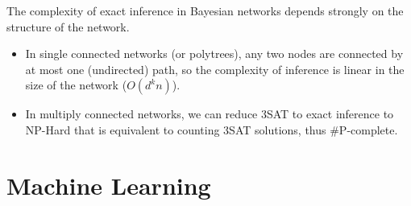\documentclass[12pt]{article}
\begin{document}
\begin{enumerate}[label=\textbf{U.\arabic*}]
    The complexity of exact inference in Bayesian networks depends strongly on the structure of the network.
    \begin{itemize}
        \item In single connected networks (or polytrees), any two nodes are connected by at most one (undirected) path, 
        so the complexity of inference is linear in the size of the network ($O(d^kn)$).
        \item In multiply connected networks, we can reduce 3SAT to exact inference to NP-Hard that is equivalent to
        counting 3SAT solutions, thus \#P-complete.
    \end{itemize}
\end{enumerate}

\section{Machine Learning}
\end{document}
